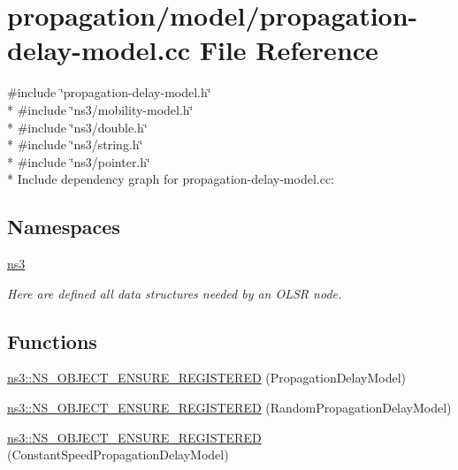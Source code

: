 \hypertarget{propagation-delay-model_8cc}{}\section{propagation/model/propagation-\/delay-\/model.cc File Reference}
\label{propagation-delay-model_8cc}
{\ttfamily \#include \char`\"{}propagation-\/delay-\/model.\+h\char`\"{}}\\*
{\ttfamily \#include \char`\"{}ns3/mobility-\/model.\+h\char`\"{}}\\*
{\ttfamily \#include \char`\"{}ns3/double.\+h\char`\"{}}\\*
{\ttfamily \#include \char`\"{}ns3/string.\+h\char`\"{}}\\*
{\ttfamily \#include \char`\"{}ns3/pointer.\+h\char`\"{}}\\*
Include dependency graph for propagation-\/delay-\/model.cc\+:
\subsection*{Namespaces}
\begin{DoxyCompactItemize}
\item 
 \hyperlink{namespacens3}{ns3}
\begin{DoxyCompactList}\small\item\em Here are defined all data structures needed by an O\+L\+SR node. \end{DoxyCompactList}\end{DoxyCompactItemize}
\subsection*{Functions}
\begin{DoxyCompactItemize}
\item 
\hyperlink{namespacens3_ab9690a0eda2f47413a64c6fd56a53f83}{ns3\+::\+N\+S\+\_\+\+O\+B\+J\+E\+C\+T\+\_\+\+E\+N\+S\+U\+R\+E\+\_\+\+R\+E\+G\+I\+S\+T\+E\+R\+ED} (Propagation\+Delay\+Model)
\item 
\hyperlink{namespacens3_aea19822e57a66d08422f4af531beb290}{ns3\+::\+N\+S\+\_\+\+O\+B\+J\+E\+C\+T\+\_\+\+E\+N\+S\+U\+R\+E\+\_\+\+R\+E\+G\+I\+S\+T\+E\+R\+ED} (Random\+Propagation\+Delay\+Model)
\item 
\hyperlink{namespacens3_a09b7412cd71c36119a9e9485cc171df4}{ns3\+::\+N\+S\+\_\+\+O\+B\+J\+E\+C\+T\+\_\+\+E\+N\+S\+U\+R\+E\+\_\+\+R\+E\+G\+I\+S\+T\+E\+R\+ED} (Constant\+Speed\+Propagation\+Delay\+Model)
\end{DoxyCompactItemize}
